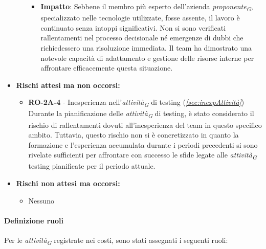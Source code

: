 \begin{itemize}
\begin{itemize}
\begin{itemize}
                    \item \textbf{Impatto}: 
                    Sebbene il membro più esperto dell'azienda \textit{proponente}\textsubscript{\textit{G}}, specializzato nelle tecnologie utilizzate, fosse assente, il lavoro è continuato senza intoppi significativi. Non si sono verificati rallentamenti nel processo decisionale né emergenze di dubbi che richiedessero una risoluzione immediata. Il team ha dimostrato una notevole capacità di adattamento e gestione delle risorse interne per affrontare efficacemente questa situazione.
                \end{itemize}
        \end{itemize}
    \item \textbf{Rischi attesi ma non occorsi:} 
        \begin{itemize}
            \item \textbf{RO-2A-4} - Inesperienza nell'\textit{attività}\textsubscript{\textit{G}} di testing (\textit{\ref{sec:inexpAttività}}) \\
            Durante la pianificazione delle \textit{attività}\textsubscript{\textit{G}} di testing, è stato considerato il rischio di rallentamenti dovuti all'inesperienza del team in questo specifico ambito. Tuttavia, questo rischio non si è concretizzato in quanto la formazione e l'esperienza accumulata durante i periodi precedenti si sono rivelate sufficienti per affrontare con successo le sfide legate alle \textit{attività}\textsubscript{\textit{G}} testing pianificate per il periodo attuale.
        \end{itemize}
    \item \textbf{Rischi non attesi ma occorsi:}
        \begin{itemize}
            \item Nessuno
        \end{itemize}
\end{itemize}


\paragraph{Definizione ruoli}
Per le \textit{attività}\textsubscript{\textit{G}} registrate nei costi, sono stati assegnati i seguenti ruoli: 

